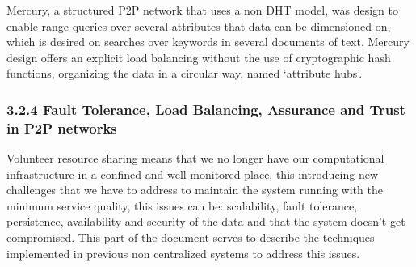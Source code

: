 \documentclass{./llncs2e/llncs}
\begin{document}
Mercury\cite{Bharambe}, a structured P2P network that uses a non DHT model, was design to enable range queries over several attributes that data can be dimensioned on, which is desired on searches over keywords in several documents of text. Mercury design offers an explicit load balancing without the use of cryptographic hash functions, organizing the data in a circular way, named `attribute hubs'.








\subsubsection{3.2.4 Fault Tolerance, Load Balancing, Assurance and Trust in P2P networks}

Volunteer resource sharing means that we no longer have our computational infrastructure in a confined and well monitored place, this introducing new challenges that we have to address \cite{Koloniari2005} to maintain the system running with the minimum service quality, this issues can be: scalability, fault tolerance, persistence, availability and security\cite{Wallach} of the data and that the system doesn't get compromised. This part of the document serves to describe the techniques implemented in previous non centralized systems to address this issues.
\end{document}
